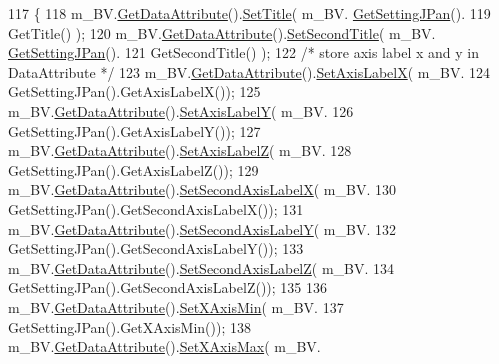 \begin{DoxyCode}
117                                       \{
118         m\_BV.\hyperlink{class_bob_viz_acc980a6db181f9ace3279e5dd3fd23b8}{GetDataAttribute}().\hyperlink{class_data_attribute_a434e57b34476663c13eb6dc37ef05cd2}{SetTitle}( m\_BV.
      \hyperlink{class_bob_viz_a10dab616869fe644d16c2ccf78627af5}{GetSettingJPan}().
119                 GetTitle() );
120         m\_BV.\hyperlink{class_bob_viz_acc980a6db181f9ace3279e5dd3fd23b8}{GetDataAttribute}().\hyperlink{class_data_attribute_ab7c3ae470051e011aa22725ad9ebab58}{SetSecondTitle}( m\_BV.
      \hyperlink{class_bob_viz_a10dab616869fe644d16c2ccf78627af5}{GetSettingJPan}().
121                 GetSecondTitle() );
122         \textcolor{comment}{/* store axis label x and y in DataAttribute */}
123         m\_BV.\hyperlink{class_bob_viz_acc980a6db181f9ace3279e5dd3fd23b8}{GetDataAttribute}().\hyperlink{class_data_attribute_a2d8c2f41d2847e3bbcb8b869d15e97f3}{SetAxisLabelX}( m\_BV.
124                 GetSettingJPan().GetAxisLabelX());        
125         m\_BV.\hyperlink{class_bob_viz_acc980a6db181f9ace3279e5dd3fd23b8}{GetDataAttribute}().\hyperlink{class_data_attribute_a31655976e5ce4d6be0b07b0a0bdcf3fc}{SetAxisLabelY}( m\_BV.
126                 GetSettingJPan().GetAxisLabelY());
127         m\_BV.\hyperlink{class_bob_viz_acc980a6db181f9ace3279e5dd3fd23b8}{GetDataAttribute}().\hyperlink{class_data_attribute_a1b57fd911860c75a1aa5ded4c0c2d707}{SetAxisLabelZ}( m\_BV.
128                 GetSettingJPan().GetAxisLabelZ());
129         m\_BV.\hyperlink{class_bob_viz_acc980a6db181f9ace3279e5dd3fd23b8}{GetDataAttribute}().\hyperlink{class_data_attribute_a0749b154967281fc88c3d50b61b82ec7}{SetSecondAxisLabelX}( m\_BV.
130                 GetSettingJPan().GetSecondAxisLabelX());        
131         m\_BV.\hyperlink{class_bob_viz_acc980a6db181f9ace3279e5dd3fd23b8}{GetDataAttribute}().\hyperlink{class_data_attribute_aa991ca454981460ff011efa92a63b83c}{SetSecondAxisLabelY}( m\_BV.
132                 GetSettingJPan().GetSecondAxisLabelY());
133         m\_BV.\hyperlink{class_bob_viz_acc980a6db181f9ace3279e5dd3fd23b8}{GetDataAttribute}().\hyperlink{class_data_attribute_a1b7436f51b0079c492b6451500230329}{SetSecondAxisLabelZ}( m\_BV.
134                 GetSettingJPan().GetSecondAxisLabelZ());
135         
136         m\_BV.\hyperlink{class_bob_viz_acc980a6db181f9ace3279e5dd3fd23b8}{GetDataAttribute}().\hyperlink{class_data_attribute_acd1994e216d21da1f3e7ea2819145fe9}{SetXAxisMin}( m\_BV.
137                 GetSettingJPan().GetXAxisMin());
138         m\_BV.\hyperlink{class_bob_viz_acc980a6db181f9ace3279e5dd3fd23b8}{GetDataAttribute}().\hyperlink{class_data_attribute_a6aedbe05a82f23d6abca00f8b85bf1ff}{SetXAxisMax}( m\_BV.

\end{DoxyCode}

